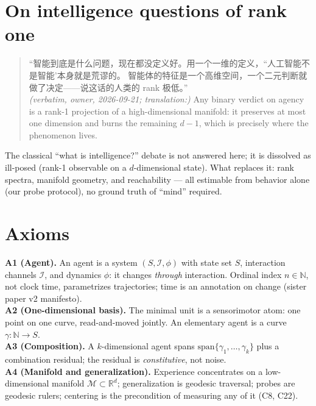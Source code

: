 \documentclass[11pt]{article}
\newcommand{\R}{\mathbb{R}}
\begin{document}
\section{On intelligence questions of rank one}
\begin{quote}
``智能到底是什么问题，现在都没定义好。用一个一维的定义，``人工智能不是智能'本身就是荒谬的。
智能体的特征是一个高维空间，一个二元判断就做了决定——说这话的人类的 rank 极低。''\\
\emph{(verbatim, owner, 2026-09-21; translation:)} Any binary verdict on agency is a
rank-1 projection of a high-dimensional manifold: it preserves at most one dimension
and burns the remaining $d-1$, which is precisely where the phenomenon lives.
\end{quote}
The classical ``what is intelligence?'' debate is not answered here; it is dissolved
as ill-posed (rank-1 observable on a $d$-dimensional state). What replaces it: rank
spectra, manifold geometry, and reachability --- all estimable from behavior alone
(our probe protocol), no ground truth of ``mind'' required.

\section{Axioms}
\textbf{A1 (Agent).} An agent is a system $(S,\mathcal{I},\phi)$ with state set $S$,
interaction channels $\mathcal{I}$, and dynamics $\phi$: it changes \emph{through} interaction.
Ordinal index $n\in\mathbb{N}$, not clock time, parametrizes trajectories; time is an
annotation on change (sister paper v2 manifesto).\\
\textbf{A2 (One-dimensional basis).} The minimal unit is a sensorimotor atom: one point
on one curve, read-and-moved jointly. An elementary agent is a curve $\gamma:\mathbb{N}\to S$.\\
\textbf{A3 (Composition).} A $k$-dimensional agent spans $\mathrm{span}\{\gamma_1,\dots,\gamma_k\}$
plus a combination residual; the residual is \emph{constitutive}, not noise.\\
\textbf{A4 (Manifold and generalization).} Experience concentrates on a low-dimensional
manifold $\mathcal{M}\subset\R^d$; generalization is geodesic traversal; probes are
geodesic rulers; centering is the precondition of measuring any of it (C8, C22).
\end{document}
